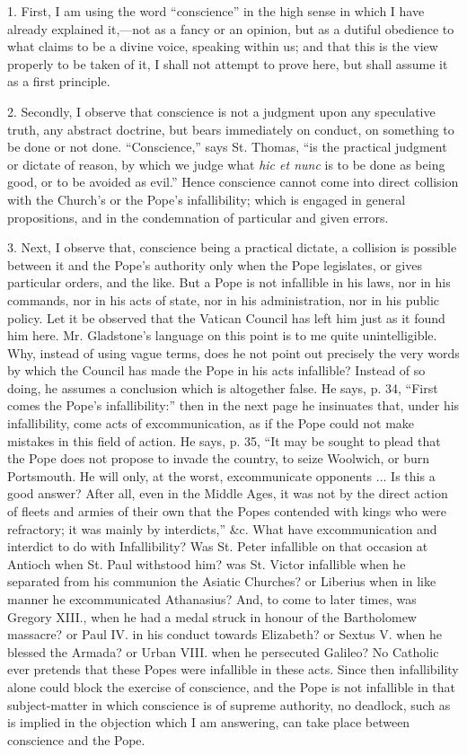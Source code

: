 1. First, I am using the word ``conscience'' in the high
sense in which I have already explained it,—not as a fancy or an
opinion, but as a dutiful obedience to what claims to be a divine voice,
speaking within us; and that this is the view properly to be taken of
it, I shall not attempt to prove here, but shall assume it as a first
principle.

2. Secondly, I observe that conscience is not a judgment upon any
speculative truth, any abstract doctrine, but bears immediately on
conduct, on something to be done or not done. ``Conscience,''
says St. Thomas, ``is the practical judgment or dictate of reason,
by which we judge what \emph{hic et nunc} is to be done as being good,
or to be avoided as evil.'' Hence conscience cannot come into direct
collision with the Church's or the Pope's infallibility; which is
engaged in general propositions, and in the condemnation of particular
and given errors.

3. Next, I observe that, conscience being a practical dictate, a
collision is possible between it and the Pope's authority only when the
Pope legislates, or gives particular orders, and the like. But a Pope is
not infallible in his laws, nor in his commands, nor in his acts of
state, nor in his administration, nor in his public policy. Let it be
observed that the Vatican Council has left him just as it found him
here. Mr. Gladstone's language on this point is to me quite
unintelligible. Why, instead of using vague terms, does he not point out
precisely the very words by which the Council has made the Pope in his
acts infallible? Instead of so doing, he assumes a conclusion which is
altogether false. He says, p. 34, ``First comes the Pope's
infallibility:'' then in the next page he insinuates that, under his
infallibility, come acts of excommunication, as if the Pope could not
make mistakes in this field of action. He says, p. 35, ``It may be
sought to plead that the Pope does not propose to invade the country, to
seize Woolwich, or burn Portsmouth. He will only, at the worst,
excommunicate opponents ... Is this a good answer? After all, even
in the Middle Ages, it was not by the direct action of fleets and armies
of their own that the Popes contended with kings who were refractory; it
was mainly by interdicts,'' \&c. What have excommunication and
interdict to do with Infallibility? Was St. Peter infallible on that
occasion at Antioch when St. Paul withstood him? was St. Victor
infallible when he separated from his communion the Asiatic Churches? or
Liberius when in like manner he excommunicated Athanasius? And, to come
to later times, was Gregory XIII., when he had a medal struck in honour
of the Bartholomew massacre? or Paul IV. in his conduct towards
Elizabeth? or Sextus V. when he blessed the Armada? or Urban VIII. when
he persecuted Galileo? No Catholic ever pretends that these Popes were
infallible in these acts. Since then infallibility alone could block the
exercise of conscience, and the Pope is not infallible in that
subject-matter in which conscience is of supreme authority, no deadlock,
such as is implied in the objection which I am answering, can take place
between conscience and the Pope.

